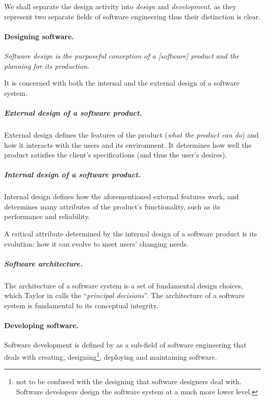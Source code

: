 \documentclass[a4paper]{article}
\begin{document}
            We shall separate the design activity into \emph{design} and \emph{development}, as they represent two separate fields of software engineering thus their distinction is clear.

            \paragraph{Designing software.}
                \textit{Software design is the purposeful conception of a [software] product and the planning for its production}\supercite{Taylor2019}.

                It is concerned with both the internal and the external design of a software system. 
                
                \subparagraph{External design of a software product.} 
                    External design defines the features of the product (\emph{what the product can do}) and how it interacts with the users and its environment. It determines how well the product satisfies the client's specifications (and thus the user's desires)\supercite{Taylor2019}.
                
                \subparagraph{Internal design of a software product.}
                    Internal design defines how the aforementioned external features work, and determines many attributes of the product's functionality, such as its performance and reliability.

                    A critical attribute determined by the internal design of a software product is its evolution: how it can evolve to meet users' changing needs\supercite{Taylor2019}.

                \subparagraph{Software architecture.} The architecture of a software system is a set of fundamental design choices, which Taylor in \cite{Taylor2019} calls the ``\emph{principal decisions}''. The architecture of a software system is fundamental to its conceptual integrity.
                
            \paragraph{Developing software.}

                Software development is defined by \cite{ibmWhatSoftware} as a sub-field of software engineering that deals with creating, designing\footnote{not to be confused with the designing that software designers deal with. Software developers design the software system at a much more lower level.}, deploying and maintaining software.
\end{document}
